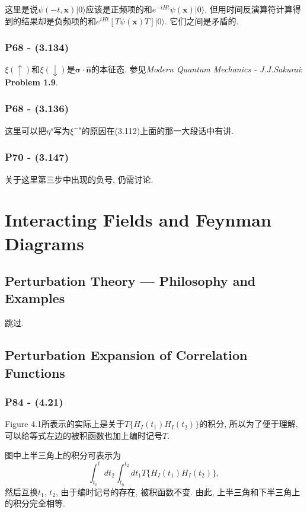 \documentclass[10pt,b5paper,openany]{book}
\begin{document}
这里是说$\psi(-t, \mathbf{x})|0\rangle$应该是正频项的和$e^{-iHt}\psi(\mathbf{x})|0\rangle$, 但用时间反演算符计算得到的结果却是负频项的和$e^{iHt}[T\psi(\mathbf{x})T]|0\rangle$. 它们之间是矛盾的. 

\subsection{P68 - (3.134)}

$\xi(\uparrow)$和$\xi(\downarrow)$是$\boldsymbol{\sigma}\cdot\mathbf{\hat{n}}$的本征态. 参见\textit{Modern Quantum Mechanics - J.J.Sakurai}: \textbf{Problem 1.9}. 

\subsection{P68 - (3.136)}

这里可以把$\eta^s$写为$\xi^{-s}$的原因在(3.112)上面的那一大段话中有讲.

\subsection{P70 - (3.147)}

关于这里第三步中出现的负号, 仍需讨论. 

\clearpage

\chapter{Interacting Fields and Feynman Diagrams}

\section{Perturbation Theory --- Philosophy and Examples}

跳过. 

\section{Perturbation Expansion of Correlation Functions}

\subsection{P84 - (4.21)}

Figure 4.1所表示的实际上是关于$T\{H_I(t_1) H_I(t_2)\}$的积分, 所以为了便于理解, 可以给等式左边的被积函数也加上编时记号$T$. 

图中上半三角上的积分可表示为
\begin{equation}
  \int_{t_0}^{t} dt_2 \int_{t_0}^{t_2} dt_1 T\{H_I(t_1) H_I(t_2)\}, 
\end{equation}
然后互换$t_1$, $t_2$, 由于编时记号的存在, 被积函数不变. 由此, 上半三角和下半三角上的积分完全相等. 
\end{document}
